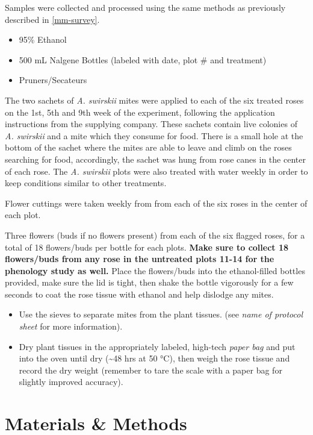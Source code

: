 \documentclass[12pt,final,CPage]{ufthesis}
\begin{document}
{  Samples were collected and processed using the same methods as previously described in \ref{mm-survey}.
  \begin{itemize}
  \tightlist
  \item
    95\% Ethanol
  \item
    500 mL Nalgene Bottles (labeled with date, plot \# and treatment)
  \item
    Pruners/Secateurs
  \end{itemize}
  The two sachets of \emph{A. swirskii} mites were applied to each of the six treated roses on the 1st, 5th and 9th week of the experiment, following the application instructions from the supplying company. These sachets contain live colonies of \emph{A. swirskii} and a mite which they consume for food. There is a small hole at the bottom of the sachet where the mites are able to leave and climb on the roses searching for food, accordingly, the sachet was hung from rose canes in the center of each rose. The \emph{A. swirskii} plots were also treated with water weekly in order to keep conditions similar to other treatments.

  Flower cuttings were taken weekly from from each of the six roses in the center of each plot.

  Three flowers (buds if no flowers present) from each of the six flagged roses, for a total of 18 flowers/buds per bottle for each plots. \textbf{Make sure to collect 18 flowers/buds from any rose in the untreated plots 11-14 for the phenology study as well.} Place the flowers/buds into the ethanol-filled bottles provided, make sure the lid is tight, then shake the bottle vigorously for a few seconds to coat the rose tissue with ethanol and help dislodge any mites.
  \begin{itemize}
  \item
    Use the sieves to separate mites from the plant tissues. (see \emph{name of protocol sheet} for more information).
  \item
    Dry plant tissues in the appropriately labeled, high-tech \emph{paper bag} and put into the oven until dry (\textasciitilde48 hrs at 50 °C), then weigh the rose tissue and record the dry weight (remember to tare the scale with a paper bag for slightly improved accuracy).
  \end{itemize}
  \hypertarget{mm-asm-ipm}{%
  \section{Materials \& Methods}\label{mm-asm-ipm}}

}
\end{document}
